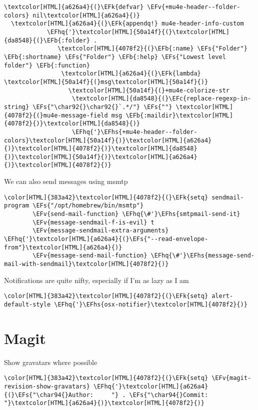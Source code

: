 \documentclass{scrartcl}
\newcommand{\EFk}[1]{\textcolor{EFk}{#1}} %
\newcommand{\EFs}[1]{\textcolor{EFs}{#1}} %
\newcommand{\EFb}[1]{\textcolor{EFb}{#1}} %
\newcommand{\EFc}[1]{\textcolor{EFc}{#1}} %
\newcommand{\EFv}[1]{\textcolor{EFv}{#1}} %
\newcommand{\EFhq}[1]{\textcolor{EFhq}{#1}} %
\newcommand{\EFhs}[1]{\textcolor{EFhs}{#1}} %
\begin{document}
\begin{Code}
\begin{Verbatim}[]
  \textcolor[HTML]{a626a4}{(}\EFk{defvar} \EFv{+mu4e-header--folder-colors} nil\textcolor[HTML]{a626a4}{)}
  \textcolor[HTML]{a626a4}{(}\EFk{appendq!} mu4e-header-info-custom
            \EFhq{'}\textcolor[HTML]{50a14f}{(}\textcolor[HTML]{da8548}{(}\EFb{:folder} .
               \textcolor[HTML]{4078f2}{(}\EFb{:name} \EFs{"Folder"} \EFb{:shortname} \EFs{"Folder"} \EFb{:help} \EFs{"Lowest level folder"} \EFb{:function}
                \textcolor[HTML]{a626a4}{(}\EFk{lambda} \textcolor[HTML]{50a14f}{(}msg\textcolor[HTML]{50a14f}{)}
                  \textcolor[HTML]{50a14f}{(}+mu4e-colorize-str
                   \textcolor[HTML]{da8548}{(}\EFc{replace-regexp-in-string} \EFs{"\char92{}\char92{}`.*/"} \EFs{""} \textcolor[HTML]{4078f2}{(}mu4e-message-field msg \EFb{:maildir}\textcolor[HTML]{4078f2}{)}\textcolor[HTML]{da8548}{)}
                   \EFhq{'}\EFhs{+mu4e-header--folder-colors}\textcolor[HTML]{50a14f}{)}\textcolor[HTML]{a626a4}{)}\textcolor[HTML]{4078f2}{)}\textcolor[HTML]{da8548}{)}\textcolor[HTML]{50a14f}{)}\textcolor[HTML]{a626a4}{)}\textcolor[HTML]{4078f2}{)}
\end{Verbatim}
\end{Code}

We can also send messages using msmtp
\begin{Code}
\begin{Verbatim}[]
\color[HTML]{383a42}\textcolor[HTML]{4078f2}{(}\EFk{setq} sendmail-program \EFs{"/opt/homebrew/bin/msmtp"}
        \EFv{send-mail-function} \EFhq{\#'}\EFhs{smtpmail-send-it}
        \EFv{message-sendmail-f-is-evil} t
        \EFv{message-sendmail-extra-arguments} \EFhq{'}\textcolor[HTML]{a626a4}{(}\EFs{"--read-envelope-from"}\textcolor[HTML]{a626a4}{)}
        \EFv{message-send-mail-function} \EFhq{\#'}\EFhs{message-send-mail-with-sendmail}\textcolor[HTML]{4078f2}{)}
\end{Verbatim}
\end{Code}

Notifications are quite nifty, especially if I'm as lazy as I am
\begin{Code}
\begin{Verbatim}[]
\color[HTML]{383a42}\textcolor[HTML]{4078f2}{(}\EFk{setq} alert-default-style \EFhq{'}\EFhs{osx-notifier}\textcolor[HTML]{4078f2}{)}
\end{Verbatim}
\end{Code}

\section{Magit}
\label{sec:orgdc6f1b6}
Show gravatars where possible
\begin{Code}
\begin{Verbatim}[]
\color[HTML]{383a42}\textcolor[HTML]{4078f2}{(}\EFk{setq} \EFv{magit-revision-show-gravatars} \EFhq{'}\textcolor[HTML]{a626a4}{(}\EFs{"\char94{}Author:     "} . \EFs{"\char94{}Commit:     "}\textcolor[HTML]{a626a4}{)}\textcolor[HTML]{4078f2}{)}
\end{Verbatim}
\end{Code}
\end{document}
